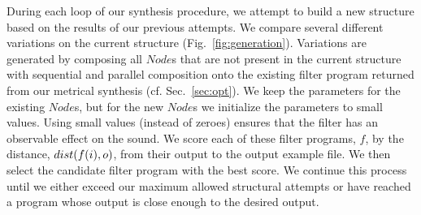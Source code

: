 During each loop of our synthesis procedure, we attempt to build a new structure based on the results of our previous attempts.
We compare several different variations on the current structure (Fig.~\ref{fig:generation}).
Variations are generated by composing all $Node$s that are not present in the current structure with sequential and parallel composition onto the existing filter program returned from our metrical synthesis (cf. Sec.~\ref{sec:opt}).
We keep the parameters for the existing $Node$s, but for the new $Node$s we initialize the parameters to small values.
Using small values (instead of zeroes) ensures that the filter has an observable effect on the sound.
We score each of these filter programs, $f$, by the distance, ${dist}(f(i), o)$, from their output to the output example file.
We then select the candidate filter program with the best score.
We continue this process until we either exceed our maximum allowed structural attempts or have reached a program whose output is close enough to the desired output.
